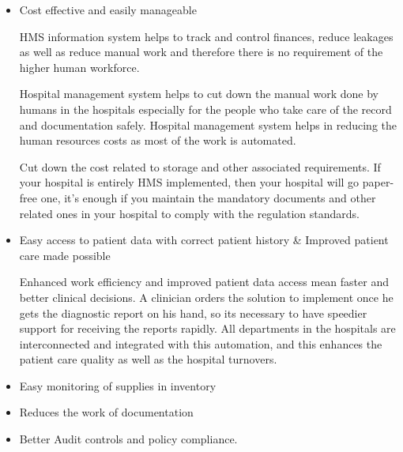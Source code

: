 \documentclass[a4paper, 14pt]{report}
\begin{document}
{\begin{itemize}
Evidence-based medicine requires the retrieving ability as well as data ability mandatorily, and this is easily achieved through a Hospital management system. If you have Hospital management system on your hospital, then you can easily access the operational, clinical and financial data of your hospitals.\\

    \item Cost effective and easily manageable
 
HMS information system helps to track and control finances, reduce leakages as well as reduce manual work and therefore there is no requirement of the higher human workforce.
 
Hospital management system helps to cut down the manual work done by humans in the hospitals especially for the people who take care of the record and documentation safely. Hospital management system helps in reducing the human resources costs as most of the work is automated.

Cut down the cost related to storage and other associated requirements. If your hospital is entirely HMS implemented, then your hospital will go paper-free one, it's enough if you maintain the mandatory documents and other related ones in your hospital to comply with the regulation standards.\\

    \item Easy access to patient data with correct patient history & Improved patient care made possible
 
Enhanced work efficiency and improved patient data access mean faster and better clinical decisions. A clinician orders the solution to implement once he gets the diagnostic report on his hand, so its necessary to have speedier support for receiving the reports rapidly. All departments in the hospitals are interconnected and integrated with this automation, and this enhances the patient care quality as well as the hospital turnovers.\\

    \item Easy monitoring of supplies in inventory\\
    \item Reduces the work of documentation\\
    \item Better Audit controls and policy compliance.\\

\end{itemize} 

}
\end{document}
